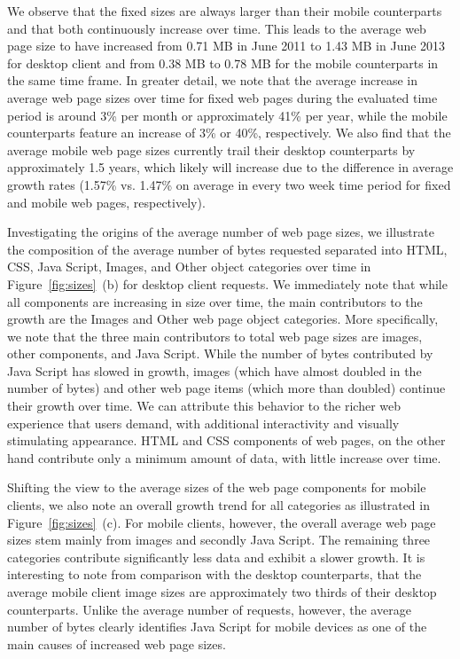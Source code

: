 \documentclass[onecolumn,12pt]{IEEEtran}
\begin{document}
We observe that the fixed sizes are always larger than their mobile counterparts and that both continuously increase over time. 
This leads to the average web page size to have increased from 0.71 MB in June 2011 to 1.43 MB in June 2013 for desktop client and from 0.38 MB to 0.78 MB for the mobile counterparts in the same time frame.
In greater detail, we note that the average increase in average web page sizes over time for fixed web pages during the evaluated time period is around 3\% per month or approximately 41\% per year, while the mobile counterparts feature an increase of 3\% or 40\%, respectively.
We also find that the average mobile web page sizes currently trail their desktop counterparts by approximately 1.5 years, which likely will increase due to the difference in average growth rates (1.57\% vs. 1.47\% on average in every two week time period for fixed and mobile web pages, respectively).

Investigating the origins of the average number of web page sizes, we illustrate the composition of the average number of bytes requested separated into HTML, CSS, Java Script, Images, and Other object categories over time in Figure~\ref{fig:sizes}~(b) for desktop client requests.
We immediately note that while all components are increasing in size over time, the main contributors to the growth are the Images and Other web page object categories.
More specifically, we note that the three main contributors to total web page sizes are images, other components, and Java Script. 
While the number of bytes contributed by Java Script has slowed in growth, images (which have almost doubled in the number of bytes) and other web page items (which more than doubled) continue their growth over time.
We can attribute this behavior to the richer web experience that users demand, with additional interactivity and visually stimulating appearance.
HTML and CSS components of web pages, on the other hand contribute only a minimum amount of data, with little increase over time.

Shifting the view to the average sizes of the web page components for mobile clients, we also note an overall growth trend for all categories as illustrated in Figure~\ref{fig:sizes}~(c).
For mobile clients, however, the overall average web page sizes stem mainly from images and secondly Java Script. 
The remaining three categories contribute significantly less data and exhibit a slower growth.
It is interesting to note from comparison with the desktop counterparts, that the average mobile client image sizes are approximately two thirds of their desktop counterparts.
Unlike the average number of requests, however, the average number of bytes clearly identifies Java Script for mobile devices as one of the main causes of increased web page sizes. 
\end{document}

